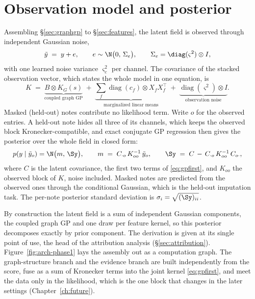 \section{Observation model and posterior}
\label{sec:gpfirst}
Assembling \S\ref{sec:graphgp} to \S\ref{sec:features}, the latent field is
observed through independent Gaussian noise,
\begin{equation}
  \tilde y \;=\; y + e, \qquad e \sim \N\bigl(0,\, \Sigma_e\bigr),
  \qquad \Sigma_e = \diag(\varsigma^2) \otimes I,
  \label{eq:obs}
\end{equation}
with one learned noise variance $\varsigma_c^2$ per channel. The covariance
of the stacked observation vector, which states the whole model in one
equation, is
\begin{equation}
K \;=\;
\underbrace{B \otimes K_G(s)}_{\text{coupled graph GP}}
\;+\; \underbrace{\sum_f \operatorname{diag}(c_f) \otimes X_f X_f^\top}_{\text{marginalized linear means}}
\;+\; \underbrace{\operatorname{diag}(\varsigma^2) \otimes I}_{\text{observation noise}} .
\label{eq:gpfirst}
\end{equation}
Masked (held-out) notes contribute no likelihood term. Write $o$ for the
observed entries. A held-out note hides all three of its channels, which
keeps the observed block Kronecker-compatible, and exact conjugate GP
regression then gives the posterior over the whole field in closed form:
\begin{equation}
  p(y \mid \tilde y_o) = \N\bigl(m,\, \Sy\bigr), \qquad
  m \;=\; C_{\cdot o}\, K_{oo}^{-1}\, \tilde y_o, \qquad
  \Sy \;=\; C \,-\, C_{\cdot o}\, K_{oo}^{-1}\, C_{o \cdot},
  \label{eq:posterior}
\end{equation}
where $C$ is the latent covariance, the first two terms of
\eqref{eq:gpfirst}, and $K_{oo}$ the observed block of $K$, noise included.
Masked notes are predicted from the observed ones through the conditional
Gaussian, which is the held-out imputation task. The per-note posterior
standard deviation is $\sigma_i = \sqrt{(\Sy)_{ii}}$.

By construction the latent field is a sum of independent Gaussian
components, the coupled graph GP and one draw per feature kernel, so this
posterior decomposes exactly by prior component. The derivation is given at
its single point of use, the head of the attribution analysis
(\S\ref{sec:attribution}). Figure~\ref{fig:arch-phase1} lays the assembly
out as a computation graph. The graph-structure branch and the evidence
branch are built independently from the score, fuse as a sum of Kronecker
terms into the joint kernel \eqref{eq:gpfirst}, and meet the data only in
the likelihood, which is the one block that changes in the later settings
(Chapter~\ref{ch:future}).

